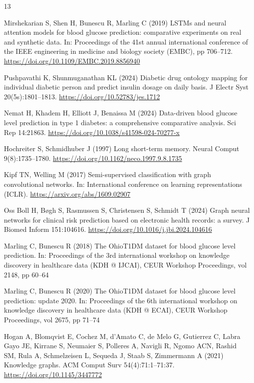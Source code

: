 \documentclass[10pt,a4paper]{article}
\begin{document}
\begin{thebibliography}{13}
\small
\setlength{\itemsep}{2pt}

Mirshekarian S, Shen H, Bunescu R, Marling C (2019) LSTMs and neural attention models for blood glucose prediction: comparative experiments on real and synthetic data. In: Proceedings of the 41st annual international conference of the IEEE engineering in medicine and biology society (EMBC), pp 706--712. \url{https://doi.org/10.1109/EMBC.2019.8856940}

Pushpavathi K, Shunmuganathan KL (2024) Diabetic drug ontology mapping for individual diabetic person and predict insulin dosage on daily basis. J Electr Syst 20(5s):1801--1813. \url{https://doi.org/10.52783/jes.1712}

Nemat H, Khadem H, Elliott J, Benaissa M (2024) Data-driven blood glucose level prediction in type 1 diabetes: a comprehensive comparative analysis. Sci Rep 14:21863. \url{https://doi.org/10.1038/s41598-024-70277-x}

Hochreiter S, Schmidhuber J (1997) Long short-term memory. Neural Comput 9(8):1735--1780. \url{https://doi.org/10.1162/neco.1997.9.8.1735}

Kipf TN, Welling M (2017) Semi-supervised classification with graph convolutional networks. In: International conference on learning representations (ICLR). \url{https://arxiv.org/abs/1609.02907}

Oss Boll H, B{\o}gh S, Rasmussen S, Christensen S, Schmidt T (2024) Graph neural networks for clinical risk prediction based on electronic health records: a survey. J Biomed Inform 151:104616. \url{https://doi.org/10.1016/j.jbi.2024.104616}

Marling C, Bunescu R (2018) The OhioT1DM dataset for blood glucose level prediction. In: Proceedings of the 3rd international workshop on knowledge discovery in healthcare data (KDH @ IJCAI), CEUR Workshop Proceedings, vol 2148, pp 60--64

Marling C, Bunescu R (2020) The OhioT1DM dataset for blood glucose level prediction: update 2020. In: Proceedings of the 6th international workshop on knowledge discovery in healthcare data (KDH @ ECAI), CEUR Workshop Proceedings, vol 2675, pp 71--74

Hogan A, Blomqvist E, Cochez M, d'Amato C, de Melo G, Gutierrez C, Labra Gayo JE, Kirrane S, Neumaier S, Polleres A, Navigli R, Ngomo ACN, Rashid SM, Rula A, Schmelzeisen L, Sequeda J, Staab S, Zimmermann A (2021) Knowledge graphs. ACM Comput Surv 54(4):71:1--71:37. \url{https://doi.org/10.1145/3447772}


\end{thebibliography}
\end{document}
